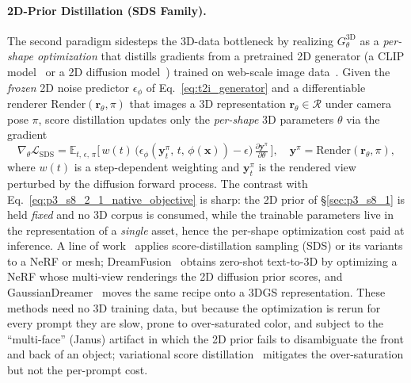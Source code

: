 \paragraph{2D-Prior Distillation (SDS Family).}
\label{para:p3_s8_2_1_sds}
The second paradigm sidesteps the 3D-data bottleneck by realizing $G_\theta^{\text{3D}}$ as a \emph{per-shape optimization} that distills gradients from a pretrained 2D generator (a CLIP model~\cite{radford2021learning} or a 2D diffusion model~\cite{rombach2022ldm}) trained on web-scale image data~\cite{schuhmann2022laion5b}.
Given the \emph{frozen} 2D noise predictor $\epsilon_\phi$ of Eq.~\eqref{eq:t2i_generator} and a differentiable renderer $\mathrm{Render}(\mathbf{r}_\theta,\pi)$ that images a 3D representation $\mathbf{r}_\theta\!\in\!\mathcal{R}$ under camera pose $\pi$, score distillation updates only the \emph{per-shape} 3D parameters $\theta$ via the gradient
\begin{equation}
\nabla_\theta \mathcal{L}_{\text{SDS}}
=
\mathbb{E}_{t,\,\epsilon,\,\pi}\Big[\,w(t)\,\big(\epsilon_\phi(\mathbf{y}_t^\pi,\,t,\,\phi(\mathbf{x})) - \epsilon\big)\,\tfrac{\partial \mathbf{y}^\pi}{\partial \theta}\,\Big],
\quad
\mathbf{y}^\pi = \mathrm{Render}(\mathbf{r}_\theta,\pi),
\label{eq:p3_s8_2_1_sds_objective}
\end{equation}
where $w(t)$ is a step-dependent weighting and $\mathbf{y}_t^\pi$ is the rendered view perturbed by the diffusion forward process.
The contrast with Eq.~\eqref{eq:p3_s8_2_1_native_objective} is sharp: the 2D prior of §\ref{sec:p3_s8_1} is held \emph{fixed} and no 3D corpus is consumed, while the trainable parameters live in the representation of a \emph{single} asset, hence the per-shape optimization cost paid at inference.
A line of work~\cite{jain2022zerodreamfields, poole2022dreamfusion, lin2023magic3d, wang2023score} applies score-distillation sampling (SDS) or its variants to a NeRF or mesh; DreamFusion~\cite{poole2022dreamfusion} obtains zero-shot text-to-3D by optimizing a NeRF whose multi-view renderings the 2D diffusion prior scores, and GaussianDreamer~\cite{yi2024gaussiandreamer} moves the same recipe onto a 3DGS representation.
These methods need no 3D training data, but because the optimization is rerun for every prompt they are slow, prone to over-saturated color, and subject to the ``multi-face'' (Janus) artifact in which the 2D prior fails to disambiguate the front and back of an object; variational score distillation~\cite{wang2023prolificdreamer} mitigates the over-saturation but not the per-prompt cost.


